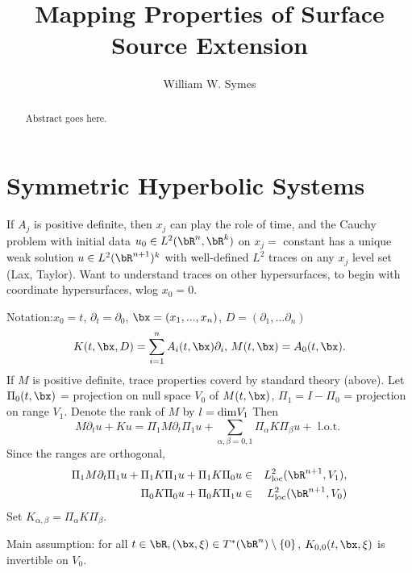 \title{Mapping Properties of Surface Source Extension}
\author{William W. Symes}

\begin{abstract}
  Abstract goes here.
\end{abstract}

\section{Symmetric Hyperbolic Systems}

If $A_j$ is positive definite, then $x_j$ can play the role of time, and the Cauchy problem with initial data $u_0 \in L^2(\bR^n,\bR^k)$  on $x_j=$ constant has a unique weak solution $u \in L^2(\bR^{n+1})^k$ with well-defined $L^2$ traces on any $x_j$ level set (Lax, Taylor). Want to understand traces on other hypersurfaces, to begin with coordinate hypersurfaces, wlog $x_0=0$.

Notation:$x_0=t$, $\partial_t=\partial_0$, $\bx = (x_1,...,x_n)$, $D=(\partial_1,...\partial_n)$
\[
  K(t,\bx,D)= \sum_{i=1}^n A_i(t,\bx)\partial_i, \, M(t,\bx) = A_0(t,\bx).
\]
If $M$ is positive definite, trace properties coverd by standard theory (above). Let $\Pi_0(t,\bx)$ = projection on null space $V_0$ of $M(t,\bx)$, $\Pi_1=I-\Pi_0$ = projection on range $V_1$. Denote the rank of $M$ by $l={\rm dim} V_1$ Then
\[
  M\partial_t u + Ku = \Pi_1 M \partial_t \Pi_1 u + \sum_{\alpha,\beta=0,1} \Pi_{\alpha}K\Pi_{\beta}u + \mbox{ l.o.t. }
\]
Since the ranges are orthogonal,
\begin{eqnarray}
  \Pi_1 M \partial_t \Pi_1 u + \Pi_1 K \Pi_1 u + \Pi_1 K \Pi_0 u & \in & L^2_{\rm loc}(\bR^{n+1},V_1),
  \label{eqn:decomp1} \\
  \Pi_0 K \Pi_0 u + \Pi_0 K \Pi_1 u & \in & L^2_{\rm loc}(\bR^{n+1},V_0)
  \label{eqn:decomp0}
\end{eqnarray}
Set $K_{\alpha,\beta} = \Pi_{\alpha}K\Pi_{\beta}$.

Main assumption: for all $t \in \bR, (\bx,\xi) \in T^*(\bR^n)\setminus \{0\}$, $K_{0,0}(t,\bx,\xi)$ is invertible on $V_0$.


